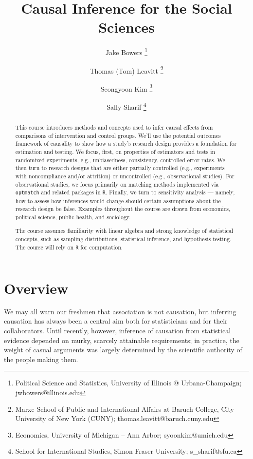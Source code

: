 \documentclass[12pt]{article}
\title{Causal Inference for the Social Sciences}
\author{Jake Bowers \thanks{Political Science and Statistics, University of Illinois @ Urbana-Champaign; \mbox{jwbowers@illinois.edu}} \and
    Thomas (Tom) Leavitt \thanks{Marxe School of Public and International Affairs at Baruch College, City University of New York (CUNY); \mbox{thomas.leavitt@baruch.cuny.edu}} \and Seongyoon Kim \thanks{Economics, University of Michigan -- Ann Arbor; \mbox{syoonkim@umich.edu}} \and Sally Sharif \thanks{School for International Studies, Simon Fraser University; \mbox{s\_sharif@sfu.ca}}
}
\begin{document}
\pagestyle{myfancy}

\maketitle
\begin{abstract}
\noindent This course introduces methods and concepts used to infer causal effects from comparisons of intervention and control groups. We'll use the potential outcomes framework of causality to show how a study's research design provides a foundation for estimation and testing. We focus, first, on properties of estimators and tests in randomized experiments, e.g., unbiasedness, consistency, controlled error rates. We then turn to research designs that are either partially controlled (e.g., experiments with noncompliance and/or attrition) or uncontrolled (e.g., observational studies). For observational studies, we focus primarily on matching methods implemented via \texttt{optmatch} and related packages in \texttt{R}. Finally, we turn to sensitivity analysis --- namely, how to assess how inferences would change should certain assumptions about the research design be false. Examples throughout the course are drawn from economics, political science, public health, and sociology.

The course assumes familiarity with linear algebra and strong knowledge of statistical concepts, such as sampling distributions, statistical inference, and hypothesis testing. The course will rely on \texttt{R} for computation.

\end{abstract}




\clearpage



\section*{Overview}

We may all warn our freshmen that association is not causation, but inferring causation has always been a central aim both for statisticians and for their collaborators. Until recently, however, inference of causation from statistical evidence depended on murky, scarcely attainable requirements; in practice, the weight of casual arguments was largely determined by the scientific authority of the people making them.
\end{document}
